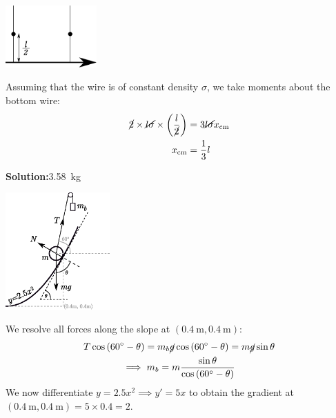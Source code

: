 \documentclass[11pt]{article}
\newcommand*\circled[1]{\tikz[baseline=(char.base)]{
		\node[shape=circle,draw,inner sep=2pt] (char) {#1};}}
\newcommand{\solution}[2]{\textbf{Solution:\hspace{1em}\circled{#1}}\hspace{1em}#2\hspace{1em}}
\newcommand{\calc}{\boxed{\textbf{CALC}} \hspace{1em}}
\newlength{\currentparskip}
\begin{document}
\begin{enumerate}[label={[Q\arabic*]},itemsep={1em}]
			\begin{minipage}[c]{4cm}
				\includegraphics[width=3.5cm]{5.eps}
			\end{minipage}%
			\begin{minipage}{\textwidth - 5cm}
				Assuming that the wire is of constant density $\sigma$, we take moments about the bottom wire:
				\begin{align*}
					\cancel{2}\times \cancel{l\sigma} \times \left(\frac{l}{\cancel{2}}\right) &= 3\cancel{l\sigma}x_{\text{cm}} \\
					x_{\text{cm}}&=\frac{1}{3}l
				\end{align*}
			\end{minipage}
		\vfill
		\item \calc \solution{C}{\SI{3.58}{\kilogram}}
		
			\begin{minipage}[c]{4.5cm}
				\includegraphics[width=4cm]{6.eps}
			\end{minipage}%
			\setlength{\currentparskip}{\parskip}		%
			\begin{minipage}{\textwidth - 6cm}
				\setlength{\parskip}{\currentparskip}	%
				We resolve all forces along the slope at $\left(\SI{0.4}{\meter}, \SI{0.4}{\meter}\right)$:
				\begin{gather*}
					T\cos\left(60\degree - \theta\right) = m_b \cancel{g}\cos\left(60\degree - \theta\right) = m\cancel{g}\sin\theta \\
					\implies m_b = m\frac{\sin\theta}{\cos\left(60\degree - \theta\right)}
				\end{gather*}
				We now differentiate $y=2.5x^2 \implies y' = 5x$ to obtain the gradient at $\left(\SI{0.4}{\meter}, \SI{0.4}{\meter}\right) = 5\times0.4 = 2$.
				

\end{minipage}
\end{enumerate}
\end{document}

